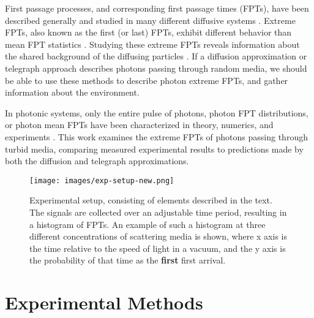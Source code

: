 \documentclass[floatfix,aps,prl,reprint,groupedaddress]{revtex4-2}
\begin{document}
First passage processes, and corresponding first passage times (FPTs), have been described generally and studied in many different diffusive systems \cite{redner_8_2001,weiss_order_1983,weiss_first_1984,weiss_applications_2002,godec_first_2016,grebenkov_escape_2017,grebenkov_molecular_2021,condamin_first-passage_2005,condamin_first-passage_2007,polizzi_mean_2016,chun_heterogeneous_2023,koren_leapover_2007,noskowicz_average_1988,benichou_zero_2008}. Extreme FPTs, also known as the first (or last) FPTs, exhibit different behavior than mean FPT statistics \cite{linn_extreme_2022,madrid_competition_2020,lawley_distribution_2020,lawley_probabilistic_2020,lawley_slowest_2023,lawley_universal_2020}. Studying these extreme FPTs reveals information about the shared background of the diffusing particles \cite{hass_anomalous_2023,hass_first-passage_2024}. If a diffusion approximation or telegraph approach describes photons passing through random media, we should be able to use these methods to describe photon extreme FPTs, and gather information about the environment.

In photonic systems, only the entire pulse of photons, photon FPT distributions, or photon mean FPTs have been characterized in theory, numerics, and experiments \cite{lee_using_2007,calba_ultrashort_2008,madsen_experimental_1992,rossetto_isotropic_2022,saulnier_scatterer_1990,long_particle_2001,weiss_applications_2002,zeller_light_2020,ishimaru_diffusion_1978,yoo_time-resolved_1990,yoo_when_1990}. This work examines the extreme FPTs of photons passing through turbid media, comparing measured experimental results to predictions made by both the diffusion and telegraph approximations.



\begin{figure}[htp]
\texttt{[image: images/exp-setup-new.png]}
\caption{\label{fig:setup} Experimental setup, consisting of elements described in the text. The signals are collected over an adjustable time period, resulting in a histogram of FPTs. An example of such a histogram at three different concentrations of scattering media is shown, where x axis is the time relative to the speed of light in a vacuum, and the y axis is the probability of that time as the \textbf{first} first arrival.}
\end{figure}


\section{Experimental Methods}\label{sec:exp_meth}
\end{document}
